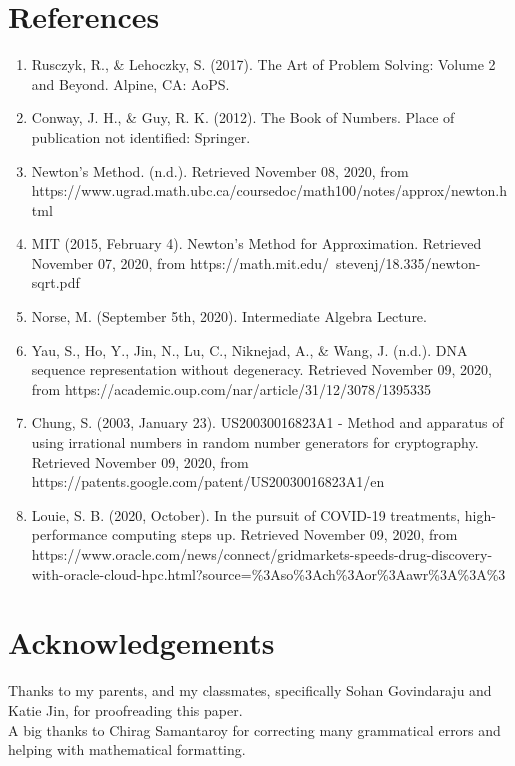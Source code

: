 \documentclass{article}
\begin{document}
\newpage 
\section*{References}



\begin{enumerate}[leftmargin=!,labelindent=5pt,itemindent=-15pt]
    \item Rusczyk, R., \& Lehoczky, S. (2017). The Art of Problem Solving: Volume 2 and Beyond. Alpine, CA: AoPS.

    \item Conway, J. H., \& Guy, R. K. (2012). The Book of Numbers. Place of publication not identified: Springer.

    \item Newton's Method. (n.d.). Retrieved November 08, 2020, from \newline https://www.ugrad.math.ubc.ca/coursedoc/math100/notes/approx/newton.html

    \item MIT (2015, February 4). Newton's Method for Approximation. Retrieved November 07, 2020, from \newline https://math.mit.edu/~stevenj/18.335/newton-sqrt.pdf
    
    \item Norse, M. (September 5th, 2020). Intermediate Algebra Lecture.
    
    \item Yau, S., Ho, Y., Jin, N., Lu, C., Niknejad, A., \& Wang, J. (n.d.). DNA sequence representation without degeneracy. Retrieved November 09, 2020, from https://academic.oup.com/nar/article/31/12/3078/1395335
    
    \item Chung, S. (2003, January 23). US20030016823A1 - Method and apparatus of using irrational numbers in random number generators for cryptography. Retrieved November 09, 2020, from \newline https://patents.google.com/patent/US20030016823A1/en
    
    \item Louie, S. B. (2020, October). In the pursuit of COVID-19 treatments, high-performance computing steps up. Retrieved November 09, 2020, from https://www.oracle.com/news/connect/gridmarkets-speeds-drug-discovery-with-oracle-cloud-hpc.html?source=\%3Aso\%3Ach\%3Aor\%3Aawr\%3A\%3A\%3
\end{enumerate}

\section*{Acknowledgements}
Thanks to my parents, and my classmates, specifically Sohan Govindaraju and Katie Jin, for proofreading this paper.
\\
A big thanks to Chirag Samantaroy for correcting many grammatical errors and helping with mathematical formatting.
\end{document}

